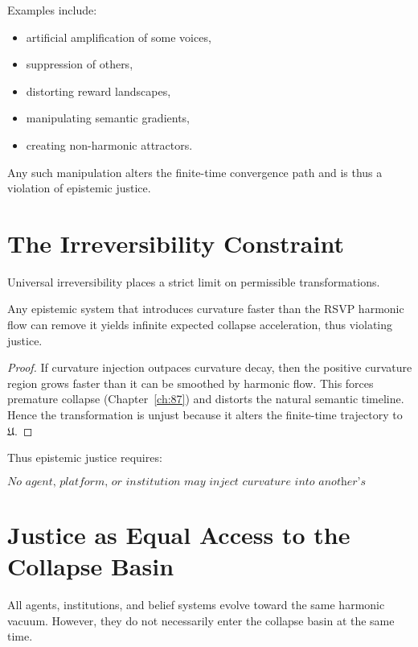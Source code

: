 Examples include:

\begin{itemize}
\item artificial amplification of some voices,
\item suppression of others,
\item distorting reward landscapes,
\item manipulating semantic gradients,
\item creating non-harmonic attractors.
\end{itemize}

Any such manipulation alters the finite-time convergence path and is
thus a violation of epistemic justice.

\section{The Irreversibility Constraint}

Universal irreversibility places a strict limit on permissible
transformations.

\begin{theorem}
\label{thm:irreversibility-justice}
Any epistemic system that introduces curvature faster than the RSVP
harmonic flow can remove it yields infinite expected collapse
acceleration, thus violating justice.
\end{theorem}

\begin{proof}
If curvature injection outpaces curvature decay, then the positive
curvature region grows faster than it can be smoothed by harmonic flow.
This forces premature collapse (Chapter~\ref{ch:87}) and distorts the
natural semantic timeline.  
Hence the transformation is unjust because it alters the finite-time
trajectory to~$\mathfrak{U}$.
\end{proof}

Thus epistemic justice requires:

\[
\textit{No agent, platform, or institution may inject curvature into
another’s semantic trajectory.}
\]

\section{Justice as Equal Access to the Collapse Basin}

All agents, institutions, and belief systems evolve toward the same
harmonic vacuum.
However, they do not necessarily enter the collapse basin at the same
time.

